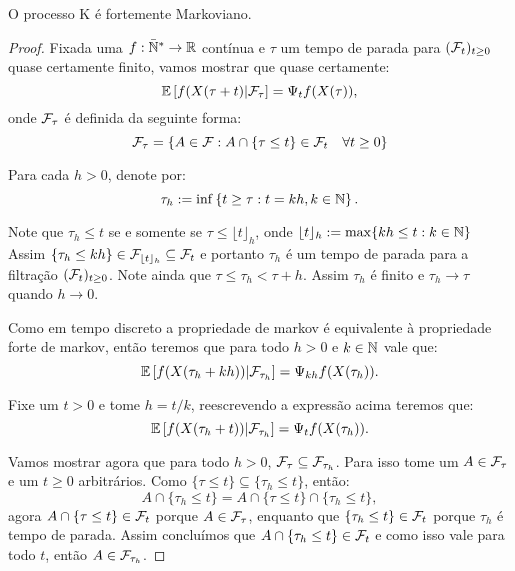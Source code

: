 \begin{proposicao}
  \label{prop:markov-forte}
  O processo K é fortemente Markoviano.
\end{proposicao}
\begin{proof}
  Fixada uma $f: {\mathbb{\bar{N}^*}} \to {\mathbb{R}}$ contínua e $\tau$ um tempo de parada
  para $({\mathcal{F}}_t)_{t \geq 0}$ quase certamente finito, vamos mostrar que
  quase certamente:
  \begin{equation}
    \label{eq:markov-forte}
    {\mathbb{E}} \left[ f(X(\tau + t) \middle| {\mathcal{F}}_\tau \right]
    = \Psi_t f (X(\tau)),
  \end{equation}
  onde ${\mathcal{F}}_\tau$ é definida da seguinte forma:
  \begin{displaymath}
    {\mathcal{F}}_\tau = \left\{
      A \in {\mathcal{F}}:  A \cap \{\tau \leq t\} \in {\mathcal{F}}_t \quad \forall t \geq 0 
    \right\}
  \end{displaymath}


  Para cada $h > 0$, denote por: 
  \begin{displaymath}
    \tau_h := \inf\left\{
      t \geq \tau: t = k h, k \in {\mathbb{N}}
    \right\}.
  \end{displaymath}

  Note que $\tau_h \leq t$ se e somente se $\tau \leq \lfloor t
  \rfloor_h$, onde $\lfloor t \rfloor_h := \max\{k h \leq t: k \in
  {\mathbb{N}}\}$ Assim $\{\tau_h \leq k h\} \in {\mathcal{F}}_{\lfloor t \rfloor_h}
  \subseteq {\mathcal{F}}_t$ e portanto $\tau_h$ é um tempo de parada para a
  filtração $({\mathcal{F}}_{t})_{t \geq 0}$. Note ainda que $\tau \leq \tau_h
  < \tau + h$. Assim $\tau_h$ é \qc finito e $\tau_h \to \tau$ \qc
  quando $h \to 0$.

  Como em tempo discreto a propriedade de markov é equivalente à
  propriedade forte de markov, então teremos que para todo $h > 0$ e
  $k \in {\mathbb{N}}$ vale que:
 \begin{displaymath}
    {\mathbb{E}} \left[ f(X(\tau_h + k h)) \middle| {\mathcal{F}}_{\tau_h} \right]
    = \Psi_{k h} f (X(\tau_h)).
  \end{displaymath}
  
  Fixe um $t > 0$ e tome $h = t/k$, reescrevendo a expressão acima
  teremos que:
  \begin{displaymath}
    \label{eq:markov-forte-esp-cond}
    {\mathbb{E}} \left[ f(X(\tau_h + t)) \middle| {\mathcal{F}}_{\tau_h} \right]
    = \Psi_t f (X(\tau_h)).
  \end{displaymath}


  Vamos mostrar agora que para todo $h > 0$, ${\mathcal{F}}_{\tau} \subseteq
  {\mathcal{F}}_{\tau_h}$. Para isso tome um $A \in {\mathcal{F}}_\tau$ e um $t \geq 0$
  arbitrários. Como $\{\tau \leq t\} \subseteq \{\tau_h \leq t\}$,
  então:
  \begin{displaymath}
    A \cap \{ \tau_h \leq t \} =
    A \cap \{ \tau \leq t \} \cap \{ \tau_h \leq t \},
  \end{displaymath}
  agora $A \cap \{ \tau \leq t \} \in {\mathcal{F}}_t$ porque $A \in {\mathcal{F}}_\tau$,
  enquanto que $ \{ \tau_h \leq t \} \in {\mathcal{F}}_t$ porque $\tau_h$ é
  tempo de parada. Assim concluímos que $A \cap \{ \tau_h \leq t \}
  \in {\mathcal{F}}_t$ e como isso vale para todo $t$, então $A \in
  {\mathcal{F}}_{\tau_h}$.


\end{proof}
